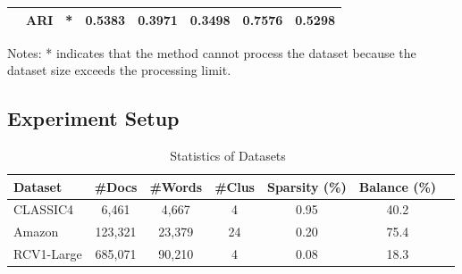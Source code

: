 \documentclass[journal]{IEEEtran}
\renewcommand{\cite}[1]{~\autocite{#1}}
\begin{document}
\begin{table}[htbp]
\begin{tabular}{@{} l c cccccc @{}}
                                    & ARI                     & *                                               & 0.5383                                        & 0.3971                                          & 0.3498                                   & \textbf{0.7576}        & 0.5298                   \\
        \bottomrule
    \end{tabular}
    \begin{tablenotes}
        \small
        \item Notes: * indicates that the method cannot process the dataset because the dataset size exceeds the processing limit.
    \end{tablenotes}
\end{table}


\subsection{Experiment Setup}

\begin{table}[h]
    \centering
    \caption{Statistics of Datasets\cite{role2019CoClustPythonPackage}}
    \label{tab:dataset-statistics}
    \begin{tabular}{lccc@{}c@{}c@{}c}
        \hline
        \textbf{Dataset} & \textbf{\#Docs} & \textbf{\#Words} & \textbf{\#Clus} & \textbf{Sparsity (\%)} & \textbf{Balance (\%)} \\
        \hline
        CLASSIC4         & 6,461           & 4,667            & 4               & 0.95                   & 40.2                  \\
        Amazon           & 123,321         & 23,379           & 24              & 0.20                   & 75.4                  \\
        RCV1-Large       & 685,071         & 90,210           & 4               & 0.08                   & 18.3                  \\
        \hline
    \end{tabular}
\end{table}
\end{document}
